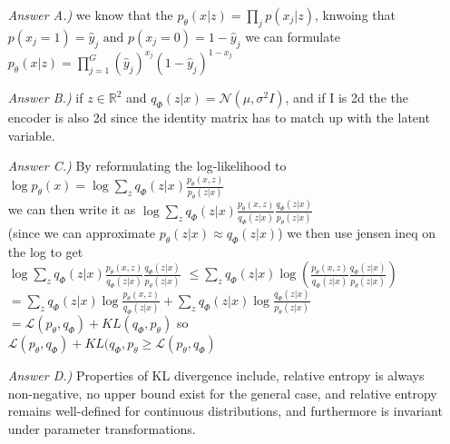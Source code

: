 \documentclass{article}
\theoremstyle{definition}
\theoremstyle{remark}
\begin{document}
	
	\begin{enumerate}[font={\Large\bfseries}]
		        
		\begin{itemize}
			\item[\textit{Answer A.)}] we know that the $p_{\theta}(x|z) = \prod_{j} p(x_j | z)$, knwoing that $p(x_j=1) = \hat{y}_j \text{ and } p(x_j=0) = 1-\hat{y}_j$ we can 
			formulate $p_{\theta}(x|z) = \prod_{j=1}^{G} (\hat{y}_{j})^{x_{j}} (1-\hat{y}_{j})^{1-x_{j}}$

			\item[\textit{Answer B.)}] if $z \in \mathbb{R}^2$ and $q_{\Phi}(z|x) = \mathcal{N}(\mu, \sigma^2I)$, and if I is 2d the the encoder is also 2d since the 
			identity matrix has to match up with the latent variable.

			\item[\textit{Answer C.)}] By reformulating the log-likelihood to $\log p_{\theta}(x) = \log \sum_z q_{\Phi}(z|x) \frac{p_{\theta}(x,z)}{p_{\theta}(z|x)}$\\
			we can then write it as $\log \sum_z q_{\Phi}(z|x) \frac{p_{\theta}(x,z)}{q_{\Phi}(z|x)} \frac{q_{\Phi}(z|x)}{p_{\theta}(z|x)}$\\ (since we can approximate
			$p_{\theta}(z|x) \approx q_{\Phi}(z|x)$) we then use jensen ineq on the log to get\\
			$\log \sum_z q_{\Phi}(z|x) \frac{p_{\theta}(x,z)}{q_{\Phi}(z|x)} \frac{q_{\Phi}(z|x)}{p_{\theta}(z|x)}$ 
			$\leq \sum_z q_{\Phi}(z|x) \log (\frac{p_{\theta}(x,z)}{q_{\Phi}(z|x)} \frac{q_{\Phi}(z|x)}{p_{\theta}(z|x)})$\\
			$= \sum_z q_{\Phi}(z|x) \log \frac{p_{\theta}(x,z)}{q_{\Phi}(z|x)} + \sum_z q_{\Phi}(z|x) \log \frac{q_{\Phi}(z|x)}{p_{\theta}(z|x)}$
			$= \mathcal{L}(p_{\theta}, q_{\Phi}) + KL(q_{\Phi}, p_{\theta})$ so\\ 
			$\mathcal{L}(p_{\theta}, q_{\Phi}) + KL(q_{\Phi}, p_{\theta} \geq \mathcal{L}(p_{\theta}, q_{\Phi})$

			\item[\textit{Answer D.)}] Properties of KL divergence include, relative entropy is always non-negative, no upper bound exist for the general case,
			and relative entropy remains well-defined for continuous distributions, and furthermore is invariant under parameter transformations.


\end{itemize}
\end{enumerate}
\end{document}

